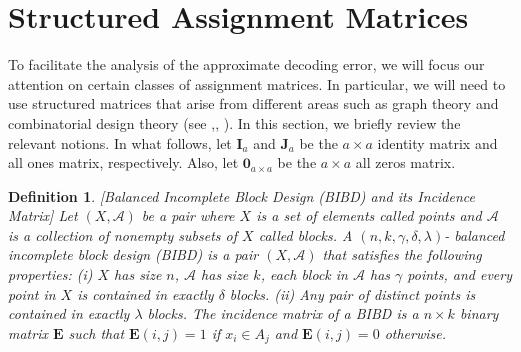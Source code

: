 \documentclass[journal,draftcls,onecolumn]{IEEEtran}
\theoremstyle{mystyle}
\newtheorem{defn}{Definition}
\begin{document}





\section{Structured Assignment Matrices}

\label{sec:structured_matrices}


To facilitate the analysis of the approximate decoding error, we will focus our attention on certain classes of assignment matrices. In particular, we will need to use structured matrices that arise from different areas such as graph theory and combinatorial design theory (see \cite{godsil-royle-algebraic},\cite{Brouwer_SRG}, \cite{StinsonBook}). In this section, we briefly review the relevant notions. In what follows, let $\mathbf{I}_a$ and $\mathbf{J}_a$ be the $a \times a$ identity matrix and all ones matrix, respectively. Also, let $\mathbf{0}_{a \times a}$ be the $a \times a$ all zeros matrix. 



\begin{defn} {[{\it Balanced Incomplete Block Design (BIBD) and its Incidence Matrix}]} Let $(X, \mathcal{A})$ be a pair where $X$ is a set of elements called points and $\mathcal{A}$ is a collection of nonempty subsets of $X$ called blocks. A $(n,k, \gamma, \delta, \lambda)$- balanced incomplete block design (BIBD) is a pair $(X, \mathcal{A})$ that satisfies the following properties: {\it (i)} $X$ has size $n$, $\mathcal{A}$ has size $k$, each block in $\mathcal{A}$ has $\gamma$ points, and every point in $X$ is contained in exactly $\delta$ blocks. {\it (ii)} Any pair of distinct points is contained in exactly $\lambda$ blocks. The incidence matrix of a BIBD is a $n \times k$ binary matrix $\mathbf{E}$ such that $\mathbf{E}(i,j) = 1$ if $x_i \in A_j$ and $\mathbf{E}(i,j) = 0$ otherwise. 
     
\end{defn}
\end{document}
